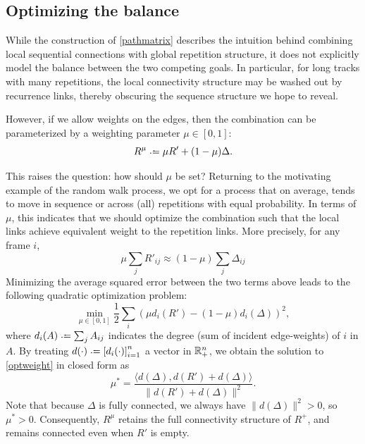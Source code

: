 \documentclass{article}
\begin{document}


\subsection{Optimizing the balance}
While the construction of \cref{pathmatrix} describes the intuition behind combining
local sequential connections with global repetition structure, it does not explicitly
model the balance between the two competing goals.  In particular, for long tracks
with many repetitions, the local connectivity structure may be washed out by
recurrence links, thereby obscuring the sequence structure we hope to reveal.

However, if we allow weights on the edges, then the combination can be parameterized 
by a weighting parameter $\mu \in [0, 1]$:
\begin{equation}
R^\mu \defeq \mu R' + (1 - \mu) \Delta. \label{weightedsum}
\end{equation}

This raises the question: how should $\mu$ be set?  Returning to the motivating
example of the random walk process, we opt for a process that on average, tends to
move in sequence or across (all) repetitions with equal probability.  In terms of
$\mu$, this indicates that we should optimize the combination such that the local
links achieve equivalent weight to the repetition links.  More precisely, for any 
frame $i$,
$$
\mu \sum_j R'_{ij} \approx (1-\mu) \sum_j \Delta_{ij} 
$$
Minimizing the average squared error between the two terms above leads to the
following quadratic optimization problem:
\begin{equation}
\min_{\mu \in [0, 1]} \frac{1}{2} \sum_i {(\mu d_i(R') - (1 - \mu)d_i(\Delta))}^2,\label{optweight}
\end{equation}
where $d_i(A) \defeq \sum_j A_{ij}$ indicates the degree (sum of incident edge-weights) 
of $i$ in $A$. By treating $d(\cdot) \defeq {[d_i(\cdot)]}_{i=1}^n$ a vector in 
$\mathbb{R}^n_+$, we obtain the solution to \cref{optweight} in closed form as
\begin{equation}
\mu^* = \frac{\langle d(\Delta), d(R') + d(\Delta)\rangle}{\|d(R') +
d(\Delta)\|^2}.\label{optweight:solution}
\end{equation}
Note that because $\Delta$ is fully connected, we always have $\|d(\Delta)\|^2 > 0$,
so $\mu^* > 0$.  Consequently, $R^\mu$ retains the full connectivity structure
of $R^+$, and remains connected even when $R'$ is empty.
\end{document}
